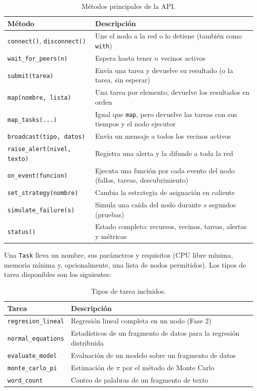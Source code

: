 \documentclass{article}
\begin{document}
\begin{table}[htbp]
\centering
\small
\begin{tabular}{|p{}|p{}|}
\hline
\textbf{Método} & \textbf{Descripción} \\ \hline
\texttt{connect()}, \texttt{disconnect()} & Une el nodo a la red o lo detiene (también como \texttt{with}) \\ \hline
\texttt{wait\_for\_peers(n)} & Espera hasta tener $n$ vecinos activos \\ \hline
\texttt{submit(tarea)} & Envía una tarea y devuelve su resultado (o la tarea, sin esperar) \\ \hline
\texttt{map(nombre, lista)} & Una tarea por elemento; devuelve los resultados en orden \\ \hline
\texttt{map\_tasks(...)} & Igual que \texttt{map}, pero devuelve las tareas con sus tiempos y el nodo ejecutor \\ \hline
\texttt{broadcast(tipo, datos)} & Envía un mensaje a todos los vecinos activos \\ \hline
\texttt{raise\_alert(nivel, texto)} & Registra una alerta y la difunde a toda la red \\ \hline
\texttt{on\_event(funcion)} & Ejecuta una función por cada evento del nodo (fallos, tareas, descubrimiento) \\ \hline
\texttt{set\_strategy(nombre)} & Cambia la estrategia de asignación en caliente \\ \hline
\texttt{simulate\_failure(s)} & Simula una caída del nodo durante $s$ segundos (pruebas) \\ \hline
\texttt{status()} & Estado completo: recursos, vecinos, tareas, alertas y métricas \\ \hline
\end{tabular}
\caption{Métodos principales de la API.}
\label{tab:api}
\end{table}

Una \texttt{Task} lleva un nombre, sus parámetros y requisitos (CPU libre mínima, memoria mínima y,
opcionalmente, una lista de nodos permitidos). Los tipos de tarea disponibles son los siguientes:

\begin{table}[htbp]
\centering
\small
\begin{tabular}{|l|p{}|}
\hline
\textbf{Tarea} & \textbf{Descripción} \\ \hline
\texttt{regresion\_lineal} & Regresión lineal completa en un nodo (Fase 2) \\ \hline
\texttt{normal\_equations} & Estadísticos de un fragmento de datos para la regresión distribuida \\ \hline
\texttt{evaluate\_model} & Evaluación de un modelo sobre un fragmento de datos \\ \hline
\texttt{monte\_carlo\_pi} & Estimación de $\pi$ por el método de Monte Carlo \\ \hline
\texttt{word\_count} & Conteo de palabras de un fragmento de texto \\ \hline
\end{tabular}
\caption{Tipos de tarea incluidos.}
\label{tab:tareas}
\end{table}
\end{document}
